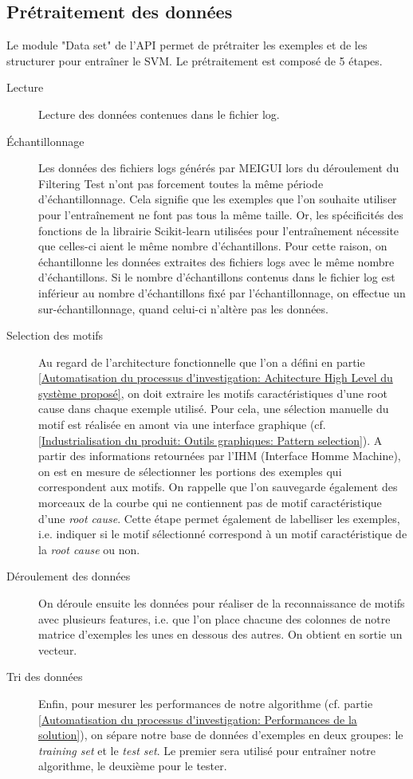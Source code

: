 \subsection{Prétraitement des données}
\label{Industrialisation du produit: API: Pré-traitement et traitement des données}
Le module "Data set" de l'API permet de prétraiter les exemples et de les structurer pour entraîner le SVM. 
Le prétraitement est composé de 5 étapes.
\begin{description}
	\item [Lecture] Lecture des données contenues dans le fichier log. 
	
	\item [Échantillonnage] Les données des fichiers logs générés par MEIGUI lors du déroulement du Filtering Test n'ont pas forcement toutes la même période d'échantillonnage. Cela signifie que les exemples que l'on souhaite utiliser pour l'entraînement ne font pas tous la même taille. Or, les spécificités des fonctions de la librairie Scikit-learn utilisées pour l'entraînement nécessite que celles-ci aient le même nombre d'échantillons. Pour cette raison, on échantillonne les données extraites des fichiers logs avec le même nombre d'échantillons. Si le nombre d'échantillons contenus dans le fichier log est inférieur au nombre d'échantillons fixé par l'échantillonnage, on effectue un sur-échantillonnage, quand celui-ci n'altère pas les données. 
	
	\item [Selection des motifs] Au regard de l'architecture fonctionnelle que l'on a défini en partie \ref{Automatisation du processus d'investigation: Achitecture High Level du système proposé}, on doit extraire les motifs caractéristiques d'une root cause dans chaque exemple utilisé. Pour cela, une sélection manuelle du motif est réalisée en amont via une interface graphique (cf. \ref{Industrialisation du produit: Outils graphiques: Pattern selection}). A partir des informations retournées par l'IHM (Interface Homme Machine), on est en mesure de sélectionner les portions des exemples qui correspondent aux motifs. On rappelle que l'on sauvegarde également des morceaux de la courbe qui ne contiennent pas de motif caractéristique d'une \emph{root cause}. Cette étape permet également de labelliser les exemples, i.e. indiquer si le motif sélectionné correspond à un motif caractéristique de la \emph{root cause} ou non.
	
	\item [Déroulement des données] On déroule ensuite les données pour réaliser de la reconnaissance de motifs avec plusieurs features, i.e. que l'on place chacune des colonnes de notre matrice d'exemples les unes en dessous des autres. On obtient en sortie un vecteur. 
	
	\item [Tri des données] Enfin, pour mesurer les performances de notre algorithme (cf. partie \ref{Automatisation du processus d'investigation: Performances de la solution}), on sépare notre base de données d'exemples en deux groupes: le \emph{training set} et le \emph{test set}. Le premier sera utilisé pour entraîner notre algorithme, le deuxième pour le tester. 
\end{description}

